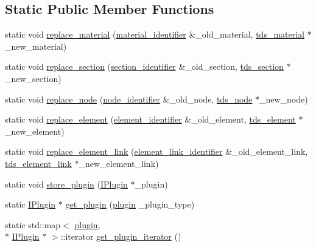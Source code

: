 \subsection*{Static Public Member Functions}
\begin{DoxyCompactItemize}
\item 
static void \hyperlink{classIPlugin_a71df92f53107b9bcd192b5350015564a}{replace\-\_\-material} (\hyperlink{structmaterial__identifier}{material\-\_\-identifier} \&\-\_\-old\-\_\-material, \hyperlink{classtds__material}{tds\-\_\-material} $\ast$\-\_\-new\-\_\-material)
\item 
static void \hyperlink{classIPlugin_a556bd8c06154fd0c8d242716800a1cbd}{replace\-\_\-section} (\hyperlink{structsection__identifier}{section\-\_\-identifier} \&\-\_\-old\-\_\-section, \hyperlink{classtds__section}{tds\-\_\-section} $\ast$\-\_\-new\-\_\-section)
\item 
static void \hyperlink{classIPlugin_af24478525e3d6e2ae4f1ea4c0a45447f}{replace\-\_\-node} (\hyperlink{structnode__identifier}{node\-\_\-identifier} \&\-\_\-old\-\_\-node, \hyperlink{classtds__node}{tds\-\_\-node} $\ast$\-\_\-new\-\_\-node)
\item 
static void \hyperlink{classIPlugin_a2d54b9b3448793b0727fadbc88c4a638}{replace\-\_\-element} (\hyperlink{structelement__identifier}{element\-\_\-identifier} \&\-\_\-old\-\_\-element, \hyperlink{classtds__element}{tds\-\_\-element} $\ast$\-\_\-new\-\_\-element)
\item 
static void \hyperlink{classIPlugin_a69d193a4010c669c8fcab69e65aa71cc}{replace\-\_\-element\-\_\-link} (\hyperlink{structelement__link__identifier}{element\-\_\-link\-\_\-identifier} \&\-\_\-old\-\_\-element\-\_\-link, \hyperlink{classtds__element__link}{tds\-\_\-element\-\_\-link} $\ast$\-\_\-new\-\_\-element\-\_\-link)
\item 
static void \hyperlink{classIPlugin_a580c91846f40f7a7f0c8d6819af66c42}{store\-\_\-plugin} (\hyperlink{classIPlugin}{I\-Plugin} $\ast$\-\_\-plugin)
\item 
static \hyperlink{classIPlugin}{I\-Plugin} $\ast$ \hyperlink{classIPlugin_a556f56970ad0bfcaf7f9fa58332a471c}{get\-\_\-plugin} (\hyperlink{plugins_8hh_af34747f68f9b0963dea6e8f3c659659c}{plugin} \-\_\-plugin\-\_\-type)
\item 
static std\-::map$<$ \hyperlink{plugins_8hh_af34747f68f9b0963dea6e8f3c659659c}{plugin}, \\*
\hyperlink{classIPlugin}{I\-Plugin} $\ast$ $>$\-::iterator \hyperlink{classIPlugin_a1d69f3981baaa8a18abd6ba5f417f6d2}{get\-\_\-plugin\-\_\-iterator} ()

\end{DoxyCompactItemize}
